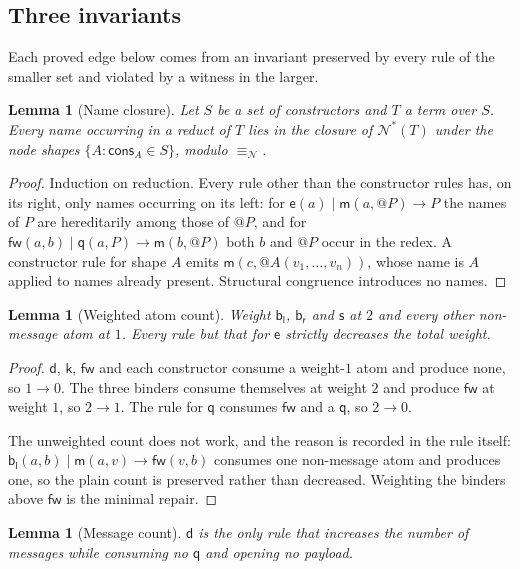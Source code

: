 \documentclass[11pt]{article}
\makeatletter
\theoremstyle{plain}
\newtheorem{lemma}[theorem]{Lemma}
\theoremstyle{definition}
\theoremstyle{remark}
\newcommand{\quo}[1]{@#1}
\newcommand{\nequiv}{\equiv_{\mathcal{N}}}
\newcommand{\nms}[1]{\mathcal{N}^{*}(#1)}
\newcommand{\mm}{\mathsf{m}}
\newcommand{\dd}{\mathsf{d}}
\newcommand{\kk}{\mathsf{k}}
\newcommand{\fw}{\mathsf{fw}}
\newcommand{\bl}{\mathsf{b}_{\mathsf{l}}}
\newcommand{\br}{\mathsf{b}_{\mathsf{r}}}
\newcommand{\sy}{\mathsf{s}}
\newcommand{\ev}{\mathsf{e}}
\newcommand{\qq}{\mathsf{q}}
\newcommand{\cons}{\mathsf{cons}}
\newcommand{\red}{\longrightarrow}
\makeatother
\begin{document}
\subsection{Three invariants}

Each proved edge below comes from an invariant preserved by every rule of the
smaller set and violated by a witness in the larger.

\begin{lemma}[Name closure]
\label{lem:nonames}
Let $S$ be a set of constructors and $T$ a term over $S$. Every name
occurring in a reduct of $T$ lies in the closure of $\nms{T}$ under the node
shapes $\{A : \cons_{A} \in S\}$, modulo $\nequiv$.
\end{lemma}

\begin{proof}
Induction on reduction. Every rule other than the constructor rules has, on
its right, only names occurring on its left: for
$\ev(a) \mid \mm(a,\quo{P}) \red P$ the names of $P$ are hereditarily among
those of $\quo{P}$, and for $\fw(a,b) \mid \qq(a,P) \red \mm(b,\quo{P})$ both
$b$ and $\quo{P}$ occur in the redex. A constructor rule for shape $A$ emits
$\mm(c,\quo{A(v_{1},\dots,v_{n})})$, whose name is $A$ applied to names
already present. Structural congruence introduces no names.
\end{proof}

\begin{lemma}[Weighted atom count]
\label{lem:atomcount}
Weight $\bl$, $\br$ and $\sy$ at $2$ and every other non-message atom at
$1$. Every rule but that for $\ev$ strictly decreases the total weight.
\end{lemma}

\begin{proof}
$\dd$, $\kk$, $\fw$ and each constructor consume a weight-$1$ atom and
produce none, so $1 \to 0$. The three binders consume themselves at weight
$2$ and produce $\fw$ at weight $1$, so $2 \to 1$. The rule for $\qq$
consumes $\fw$ and a $\qq$, so $2 \to 0$.

The unweighted count does not work, and the reason is recorded in the rule
itself: $\bl(a,b) \mid \mm(a,v) \red \fw(v,b)$ consumes one non-message
atom and produces one, so the plain count is preserved rather than decreased.
Weighting the binders above $\fw$ is the minimal repair.
\end{proof}

\begin{lemma}[Message count]
\label{lem:msgcount}
$\dd$ is the only rule that increases the number of messages while consuming
no $\qq$ and opening no payload.
\end{lemma}
\end{document}
